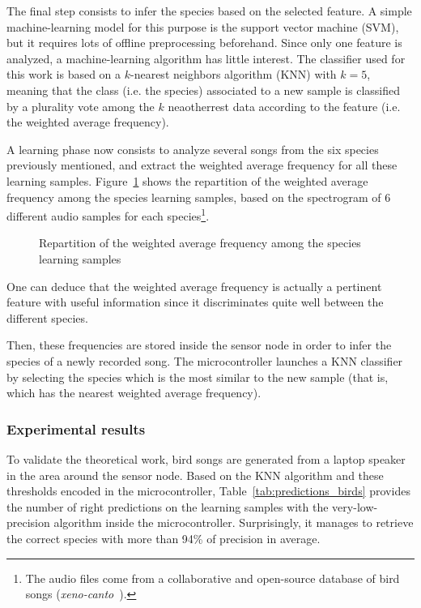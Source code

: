 \documentclass{EPL-master-thesis-covers-EN}
\begin{document}
The final step consists to infer the species based on the selected feature. A simple machine-learning model for this purpose is the support vector machine (SVM), but it requires lots of offline preprocessing beforehand. Since only one feature is analyzed, a machine-learning algorithm has little interest. The classifier used for this work is based on a $k$-nearest neighbors algorithm (KNN) with $k=5$, meaning that the class (i.e. the species) associated to a new sample is classified by a plurality vote among the $k$ neaotherrest data according to the feature (i.e. the weighted average frequency).

A learning phase now consists to analyze several songs from the six species previously mentioned, and extract the weighted average frequency for all these learning samples. Figure~\ref{fig:weighted_average_frequency} shows the repartition of the weighted average frequency among the species learning samples, based on the spectrogram of 6 different audio samples for each species\footnote{The audio files come from a collaborative and open-source database of bird songs (\textit{xeno-canto}~\cite{xeno}).}.

\begin{figure}[H]
    \centering
    
    \caption{Repartition of the weighted average frequency among the species learning samples}
    \label{fig:weighted_average_frequency}
\end{figure}

One can deduce that the weighted average frequency is actually a pertinent feature with useful information since it discriminates quite well between the different species.

Then, these frequencies are stored inside the sensor node in order to infer the species of a newly recorded song. The microcontroller launches a KNN classifier by selecting the species which is the most similar to the new sample (that is, which has the nearest weighted average frequency).

\subsubsection*{Experimental results}

To validate the theoretical work, bird songs are generated from a laptop speaker in the area around the sensor node.
Based on the KNN algorithm and these thresholds encoded in the microcontroller, Table~\ref{tab:predictions_birds} provides the number of right predictions on the learning samples with the very-low-precision algorithm inside the microcontroller. Surprisingly, it manages to retrieve the correct species with more than 94\% of precision in average.
\end{document}
